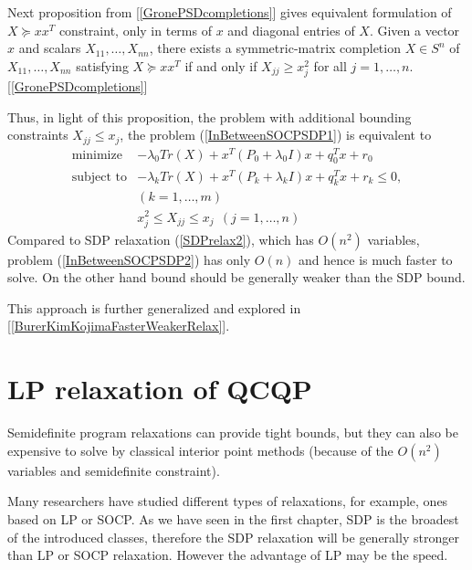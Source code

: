 \documentclass[12pt]{book}
\theoremstyle{definition}
\begin{document}
Next proposition from [\ref{GronePSDcompletions}] gives equivalent formulation of $X\succeq xx^T$ constraint, only in terms of $x$ and diagonal entries of $X$.
\prop Given a vector $x$ and scalars $X_{11},\dots ,X_{nn}$, there exists
a symmetric-matrix completion $X\in S^n$ of $X_{11},\dots ,X_{nn}$ satisfying $X \succeq xx^T$ if and only if $X_{jj} \geq x^2_j$ for all $j = 1,\dots ,n.$ \rm [\ref{GronePSDcompletions}]

Thus, in light of this proposition, the problem with additional bounding constraints $X_{jj}\leq x_j$, the problem (\ref{InBetweenSOCPSDP1}) is equivalent to 
\begin{equation}
\label{InBetweenSOCPSDP2}
\begin{array}{ll}
\mbox{minimize}& -\lambda_0 Tr(X) +  x^T(P_0+\lambda_0 I)x + q_0^Tx + r_0 \\
\mbox{subject to}& -\lambda_k Tr(X) +  x^T(P_k+\lambda_kI)x + q_k^Tx + r_k \leq 0, \\ &(k = 1,\dots ,m) \\
& x_j^2\leq X_{jj} \leq x_j \ \ (j = 1,\dots ,n)
\end{array} 
\end{equation}
Compared to SDP relaxation (\ref{SDPrelax2}), which has $O(n^2)$ variables, problem (\ref{InBetweenSOCPSDP2}) has only $O(n)$ and hence is much faster to solve. On the other hand bound should be generally weaker than the SDP bound.

This approach is further generalized and explored in [\ref{BurerKimKojimaFasterWeakerRelax}]. 



\section{LP relaxation of QCQP}

Semidefinite program relaxations can provide tight bounds, but they can also be expensive to solve by classical interior point methods (because of the $O(n^2)$ variables and semidefinite constraint). 

Many researchers have studied different types of relaxations, for example, ones based on LP or SOCP. 
As we have seen in the first chapter, SDP is the broadest of the introduced classes, therefore the SDP relaxation will be generally stronger than LP or SOCP relaxation. However the advantage of LP may be the speed. 
\end{document}

